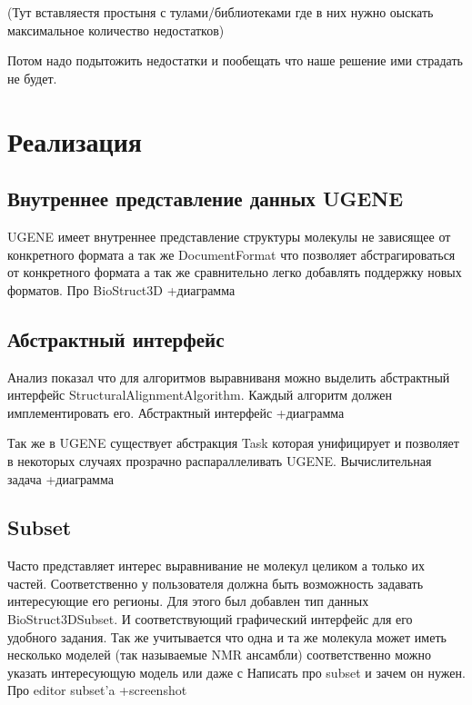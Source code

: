\documentclass[a4paper, 12pt, titlepage, utf8]{extarticle}
\begin{document}
(Тут вставляестя простыня с тулами/библиотеками где в них нужно оыскать максимальное количество недостатков)

Потом надо подытожить недостатки и пообещать что наше решение ими страдать не будет.


\section{Реализация}
\subsection{Внутреннее представление данных UGENE}
UGENE имеет внутреннее представление структуры молекулы не зависящее от конкретного формата а так же DocumentFormat что позволяет абстрагироваться от конкретного формата а так же сравнительно легко добавлять поддержку новых форматов.
Про BioStruct3D +диаграмма

\subsection{Абстрактный интерфейс}
Анализ показал что для алгоритмов выравниваня можно выделить абстрактный интерфейс StructuralAlignmentAlgorithm. Каждый алгоритм должен имплементировать его.
Абстрактный интерфейс +диаграмма

Так же в UGENE существует абстракция Task которая унифицирует и позволяет в некоторых случаях прозрачно распараллеливать UGENE.
Вычислительная задача +диаграмма

\subsection{Subset}
Часто представляет интерес выравнивание не молекул целиком а только их частей. Соответственно у пользователя должна быть возможность задавать интересующие его регионы. Для этого был добавлен тип данных BioStruct3DSubset. И соответствующий графический интерфейс для его удобного задания. Так же учитывается что одна и та же молекула может иметь несколько моделей (так называемые NMR ансамбли) соответственно можно указать интересующую модель или даже с
Написать про subset и зачем он нужен. 
Про editor subset'a
+screenshot
\end{document}
